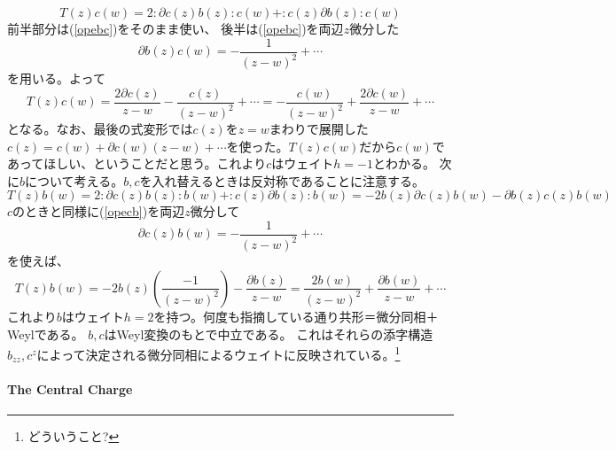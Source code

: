 \documentclass[10pt]{jsarticle}
\newcommand{\kakko}[1]{\left(#1 \right)} %
\newcommand{\del}{{\partial}} %
\begin{document}
\begin{equation}
  T(z)c(w)=2:\del c(z)b(z):c(w)+:c(z)\del b(z):c(w)
\end{equation}
前半部分は(\ref{opebc})をそのまま使い、
後半は(\ref{opebc})を両辺$z$微分した
\begin{equation}
  \del b(z)c(w)=-\frac{1}{(z-w)^2}+\cdots 
\end{equation}
を用いる。よって
\begin{equation}
  T(z)c(w)=\frac{2\del c(z)}{z-w}-\frac{c(z)}{(z-w)^2}+\cdots =-\frac{c(w)}{(z-w)^2}+\frac{2\del c(w)}{z-w}+\cdots 
\end{equation}
となる。なお、最後の式変形では$c(z)$を$z=w$まわりで展開した$c(z)=c(w)+\del c(w)(z-w)+\cdots$を使った。$T(z)c(w)$だから$c(w)$であってほしい、ということだと思う。これより$c$はウェイト$h=-1$とわかる。
次に$b$について考える。$b,c$を入れ替えるときは反対称であることに注意する。
\begin{equation}
  T(z)b(w)=2:\del c(z)b(z):b(w)+:c(z)\del b(z):b(w)=-2b(z)\del c(z)b(w)-\del b(z)c(z)b(w)
\end{equation}
$c$のときと同様に(\ref{opecb})を両辺$z$微分して
\begin{equation}
  \del c(z)b(w)=-\frac{1}{(z-w)^2}+\cdots 
\end{equation}
を使えば、
\begin{equation}
  T(z)b(w)=-2b(z)\kakko{\frac{-1}{(z-w)^2}}-\frac{\del b(z)}{z-w}=\frac{2b(w)}{(z-w)^2}+\frac{\del b(w)}{z-w}+\cdots
\end{equation}
これより$b$はウェイト$h=2$を持つ。何度も指摘している通り共形＝微分同相＋Weylである。
$b,c$はWeyl変換のもとで中立である。
これはそれらの添字構造$b_{zz},c^{z}$によって決定される微分同相によるウェイトに反映されている。\footnote{どういうこと?}
\paragraph{The Central Charge}
\end{document}
